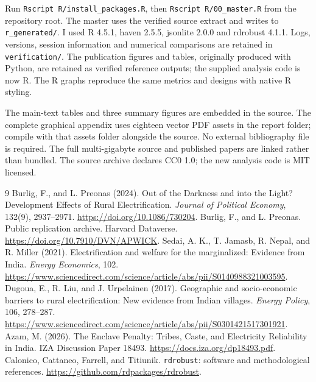 \documentclass[11pt,a4paper]{article}
\begin{document}
Run \texttt{Rscript R/install\_packages.R}, then \texttt{Rscript R/00\_master.R} from the repository root. The master uses the verified source extract and writes to \nolinkurl{r_generated/}. I used R 4.5.1, haven 2.5.5, jsonlite 2.0.0 and rdrobust 4.1.1. Logs, versions, session information and numerical comparisons are retained in \nolinkurl{verification/}. The publication figures and tables, originally produced with Python, are retained as verified reference outputs; the supplied analysis code is now R. The R graphs reproduce the same metrics and designs with native R styling.

The main-text tables and three summary figures are embedded in the source. The complete graphical appendix uses eighteen vector PDF assets in the report folder; compile with that assets folder alongside the source. No external bibliography file is required. The full multi-gigabyte source and published papers are linked rather than bundled. The source archive declares CC0 1.0; the new analysis code is MIT licensed.

\FloatBarrier
\begin{thebibliography}{9}
 Burlig, F., and L. Preonas (2024).
Out of the Darkness and into the Light? Development Effects of Rural Electrification.
\emph{Journal of Political Economy}, 132(9), 2937--2971.
\url{https://doi.org/10.1086/730204}.
 Burlig, F., and L. Preonas. Public replication archive.
Harvard Dataverse. \url{https://doi.org/10.7910/DVN/APWICK}.
 Sedai, A. K., T. Jamasb, R. Nepal, and R. Miller (2021).
Electrification and welfare for the marginalized: Evidence from India.
\emph{Energy Economics}, 102.
\url{https://www.sciencedirect.com/science/article/abs/pii/S0140988321003595}.
 Dugoua, E., R. Liu, and J. Urpelainen (2017).
Geographic and socio-economic barriers to rural electrification: New evidence from Indian villages.
\emph{Energy Policy}, 106, 278--287.
\url{https://www.sciencedirect.com/science/article/abs/pii/S0301421517301921}.
 Azam, M. (2026).
The Enclave Penalty: Tribes, Caste, and Electricity Reliability in India.
IZA Discussion Paper 18493. \url{https://docs.iza.org/dp18493.pdf}.
 Calonico, Cattaneo, Farrell, and Titiunik.
\texttt{rdrobust}: software and methodological references.
\url{https://github.com/rdpackages/rdrobust}.
\end{thebibliography}
\clearpage
\appendix
\end{document}
